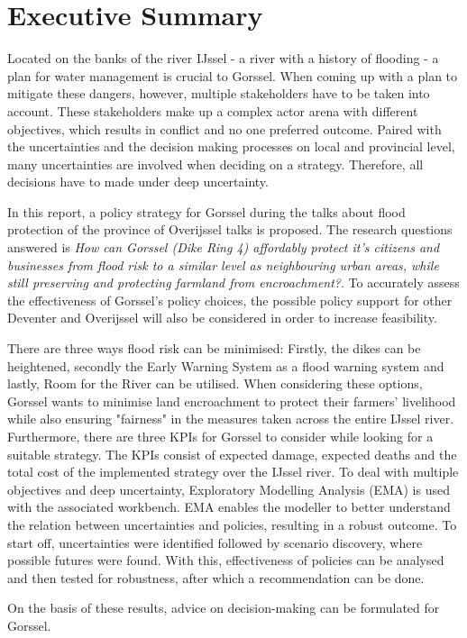 \section*{Executive Summary}
\label{s:exec_summ}

Located on the banks of the river IJssel - a river with a history of flooding - a plan for water management is crucial to Gorssel. When coming up with a plan to mitigate these dangers, however, multiple stakeholders have to be taken into account. These stakeholders make up a complex actor arena with different objectives, which results in conflict and no one preferred outcome. Paired with the uncertainties and the decision making processes on local and provincial level, many uncertainties are involved when deciding on a strategy. Therefore, all decisions have to made under deep uncertainty. 

In this report, a policy strategy for Gorssel during the talks about flood protection of the province of Overijssel talks is proposed. The research questions answered is \textit{How can Gorssel (Dike Ring 4) affordably protect it’s citizens and businesses from flood risk to a similar level as neighbouring urban areas, while still preserving and protecting farmland from encroachment?}. To accurately assess the effectiveness of Gorssel's policy choices, the possible policy support for other Deventer and Overijssel will also be considered in order to increase feasibility. 

\bigskip

\noindent There are three ways flood risk can be minimised: Firstly, the dikes can be heightened, secondly the Early Warning System as a flood warning system and lastly, Room for the River can be utilised. When considering these options, Gorssel wants to minimise land encroachment to protect their farmers' livelihood while also ensuring "fairness" in the measures taken across the entire IJssel river. Furthermore, there are three KPIs for Gorssel to consider while looking for a suitable strategy. The KPIs consist of expected damage, expected deaths and the total cost of the implemented strategy over the IJssel river. To deal with multiple objectives and deep uncertainty, Exploratory Modelling Analysis (EMA) is used with the associated workbench. EMA enables the modeller to better understand the relation between uncertainties and policies, resulting in a robust outcome. To start off, uncertainties were identified followed by scenario discovery, where possible futures were found. With this, effectiveness of policies can be analysed and then tested for robustness, after which a recommendation can be done. 


On the basis of these results, advice on decision-making can be formulated for Gorssel. 
